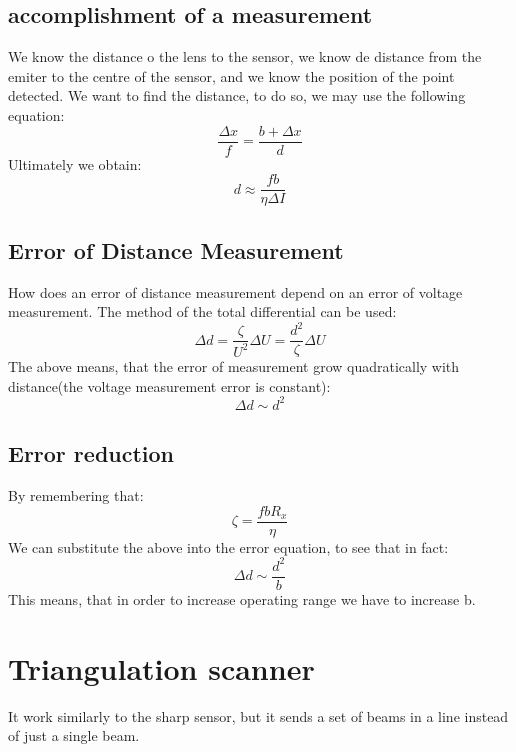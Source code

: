 \subsection{accomplishment of a measurement}

We know the distance o the lens to the sensor, we know de distance from the emiter to the centre of the sensor, and we know the position of the point detected. We want to find the distance, to do so, we may use the following equation:
\begin{equation}
    \frac{\Delta x}{f} = \frac{b+\Delta x}{d}
\end{equation}
Ultimately we obtain:
\begin{equation}
    d \approx \frac{fb}{\eta\Delta I}
\end{equation}



\subsection{Error of Distance Measurement}
How does an error of distance measurement depend on an error of voltage measurement. The method of the total differential can be used:
\begin{equation}
\Delta d = \frac{\zeta}{U^{2}}\Delta U = \frac{d^{2}}{\zeta}\Delta U
\end{equation}
The above means, that the error of measurement grow quadratically with distance(the voltage measurement error is constant):
\begin{equation}
    \Delta d \sim d^{2}
\end{equation}

\subsection{Error reduction}
By remembering that:
\begin{equation}
    \zeta = \frac{fbR_x}{\eta}
\end{equation}
We can substitute the above into the error equation, to see that in fact:
\begin{equation}
    \Delta d \sim \frac{d^{2}}{b}
\end{equation}
This means, that in order to increase operating range we have to increase b.

\section{Triangulation scanner}
It work similarly to the sharp sensor, 
but it sends a set of beams in a line instead of just a single beam.

